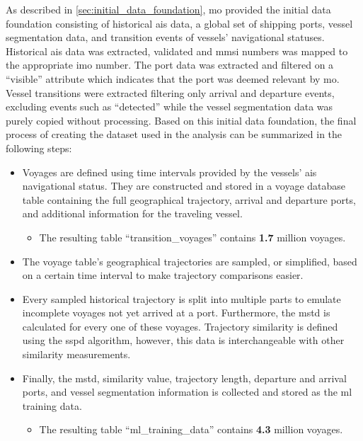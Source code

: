 As described in \cref{sec:initial_data_foundation}, \acrfull{mo} provided the initial data foundation consisting of historical \acrshort{ais} data, a global set of shipping ports, vessel segmentation data, and transition events of vessels' navigational statuses. Historical \acrshort{ais} data was extracted, validated and \acrshort{mmsi} numbers was mapped to the appropriate \acrshort{imo} number. The port data was extracted and filtered on a ``visible'' attribute which indicates that the port was deemed relevant by \acrshort{mo}. Vessel transitions were extracted filtering only arrival and departure events, excluding events such as ``detected'' while the vessel segmentation data was purely copied without processing. Based on this initial data foundation, the final process of creating the dataset used in the analysis can be summarized in the following steps:

\begin{itemize}
    \item Voyages are defined using time intervals provided by the vessels' \acrshort{ais} navigational status. They are constructed and stored in a voyage database table containing the full geographical trajectory, arrival and departure ports, and additional information for the traveling vessel.
    \begin{itemize}
        \item The resulting table ``transition\_voyages'' contains \textbf{1.7} million voyages.
    \end{itemize}
    \item The voyage table's geographical trajectories are sampled, or simplified, based on a certain time interval to make trajectory comparisons easier.
    \item Every sampled historical trajectory is split into multiple parts to emulate incomplete voyages not yet arrived at a port. Furthermore, the \acrshort{mstd} is calculated for every one of these voyages. Trajectory similarity is defined using the \acrshort{sspd} algorithm, however, this data is interchangeable with other similarity measurements.
    \item Finally, the \acrshort{mstd}, similarity value, trajectory length, departure and arrival ports, and vessel segmentation information is collected and stored as the \acrshort{ml} training data.
    \begin{itemize}
        \item The resulting table ``ml\_training\_data'' contains \textbf{4.3} million voyages.
    \end{itemize}
\end{itemize}

